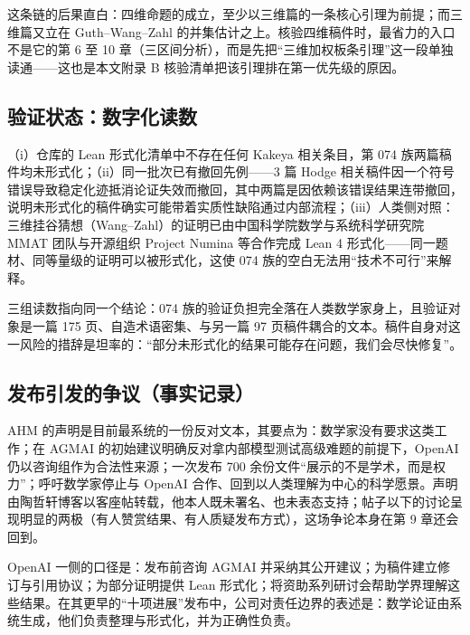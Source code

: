 这条链的后果直白：四维命题的成立，至少以三维篇的一条核心引理为前提；而三维篇又立在 Guth--Wang--Zahl 的并集估计之上。核验四维稿件时，最省力的入口不是它的第 6 至 10 章（三区间分析），而是先把“三维加权板条引理”这一段单独读通——这也是本文附录 B 核验清单把该引理排在第一优先级的原因。

\subsection{验证状态：数字化读数}

\begin{evbox}[证据：可核对的三组读数]
（i）仓库的 Lean 形式化清单中不存在任何 Kakeya 相关条目，第 074 族两篇稿件均未形式化；（ii）同一批次已有撤回先例——3 篇 Hodge 相关稿件因一个符号错误导致稳定化迹抵消论证失效而撤回，其中两篇是因依赖该错误结果连带撤回，说明未形式化的稿件确实可能带着实质性缺陷通过内部流程；（iii）人类侧对照：三维挂谷猜想（Wang--Zahl）的证明已由中国科学院数学与系统科学研究院 MMAT 团队与开源组织 Project Numina 等合作完成 Lean 4 形式化——同一题材、同等量级的证明可以被形式化，这使 074 族的空白无法用“技术不可行”来解释。
\end{evbox}

三组读数指向同一个结论：074 族的验证负担完全落在人类数学家身上，且验证对象是一篇 175 页、自造术语密集、与另一篇 97 页稿件耦合的文本。稿件自身对这一风险的措辞是坦率的：“部分未形式化的结果可能存在问题，我们会尽快修复”。

\subsection{发布引发的争议（事实记录）}

AHM 的声明是目前最系统的一份反对文本，其要点为：数学家没有要求这类工作；在 AGMAI 的初始建议明确反对拿内部模型测试高级难题的前提下，OpenAI 仍以咨询组作为合法性来源；一次发布 700 余份文件“展示的不是学术，而是权力”；呼吁数学家停止与 OpenAI 合作、回到以人类理解为中心的科学愿景。声明由陶哲轩博客以客座帖转载，他本人既未署名、也未表态支持；帖子以下的讨论呈现明显的两极（有人赞赏结果、有人质疑发布方式），这场争论本身在第 9 章还会回到。

OpenAI 一侧的口径是：发布前咨询 AGMAI 并采纳其公开建议；为稿件建立修订与引用协议；为部分证明提供 Lean 形式化；将资助系列研讨会帮助学界理解这些结果。在其更早的“十项进展”发布中，公司对责任边界的表述是：数学论证由系统生成，他们负责整理与形式化，并为正确性负责。

